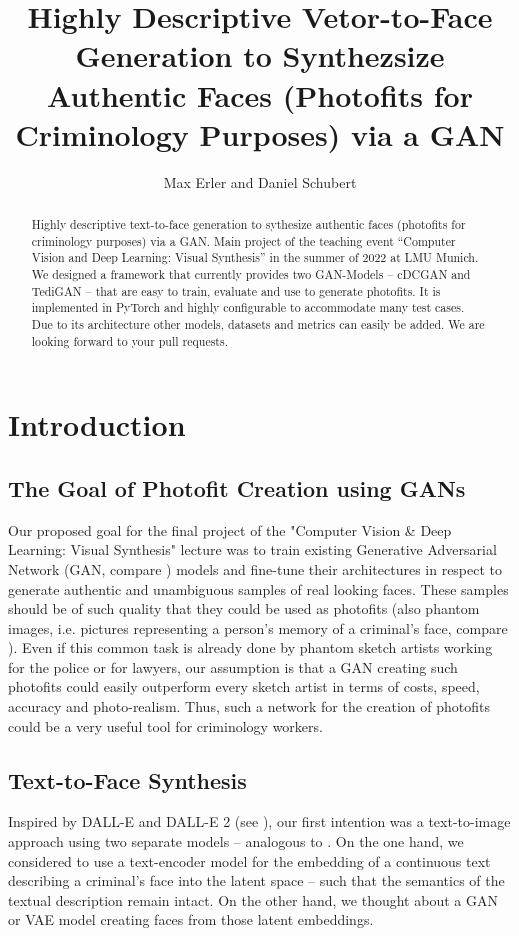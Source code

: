 \documentclass[12pt, a4paper]{article}
\title{Highly Descriptive Vetor-to-Face Generation to Synthezsize Authentic Faces (Photofits for Criminology Purposes) via a GAN}
\author{Max Erler and Daniel Schubert}
\begin{document}
\maketitle
\begin{abstract}
Highly descriptive text-to-face generation to sythesize authentic faces (photofits for criminology purposes) via a GAN. Main project of the  teaching event ``Computer Vision and Deep Learning: Visual Synthesis'' in the summer of 2022 at LMU Munich.
We designed a framework that currently provides two GAN-Models -- cDCGAN and TediGAN -- that are easy to train, evaluate and use to generate photofits. It is implemented in PyTorch and highly configurable to accommodate many test cases. Due to its architecture other models, datasets and metrics can easily be added. We are looking forward to your pull requests.

\end{abstract}
\tableofcontents

\section{Introduction}
\subsection{The Goal of Photofit Creation using GANs}\label{sec:goal}
Our proposed goal for the final project of the "Computer Vision \& Deep Learning: Visual Synthesis" lecture was to train 
existing Generative Adversarial Network (GAN, compare \cite{gan}) models and fine-tune their architectures in respect to generate authentic
and unambiguous samples of real looking faces. These samples should be of such quality that they could be used as
photofits (also phantom images, i.e. pictures representing a person's memory of a criminal's face, compare \cite{photofitDef}).
Even if this common task is already done by phantom sketch artists working for the police or for lawyers, our assumption
is that a GAN creating such photofits could easily outperform every sketch artist in terms of costs, speed, accuracy and photo-realism.
Thus, such a network for the creation of photofits could be a very useful tool for criminology workers.

\subsection{Text-to-Face Synthesis}
Inspired by DALL-E and DALL-E 2 (see \cite{dallE}), our first intention was a text-to-image approach
using two separate models -- analogous to \cite{Xia_2021_CVPR}. On the one hand, we considered to
use a text-encoder model for the embedding of a continuous text describing a criminal's face into the latent space --
such that the semantics of the textual description remain intact. On the other hand, we thought about a GAN or VAE model
creating faces from those latent embeddings.
\end{document}
